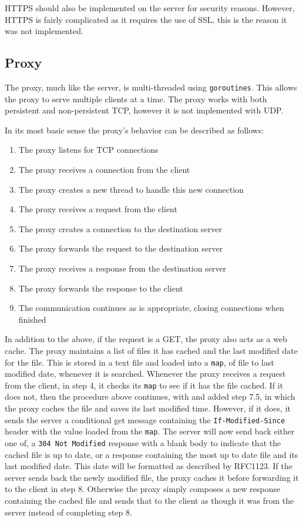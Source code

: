 \documentclass[10pt,twocolumn]{witseiepaper}
\begin{document}
	HTTPS should also be implemented on the server for security reasons. However, HTTPS is fairly complicated as it requires the use of SSL, this is the reason it was not implemented. 

	\subsection{Proxy}

	The proxy, much like the server, is multi-threaded using \texttt{goroutines}. This allows the proxy to serve multiple clients at a time. The proxy works with both persistent and non-persistent TCP, however it is not implemented with UDP. 

	In its most basic sense the proxy's behavior can be described as follows:

	\begin{enumerate}
		\item The proxy listens for TCP connections
		\item The proxy receives a connection from the client
		\item The proxy creates a new thread to handle this new connection
		\item The proxy receives a request from the client
		\item The proxy creates a connection to the destination server
		\item The proxy forwards the request to the destination server
		\item The proxy receives a response from the destination server
		\item The proxy forwards the response to the client
		\item The communication continues as is appropriate, closing connections when finished 
	\end{enumerate}

	In addition to the above, if the request is a GET, the proxy also acts as a web cache. The proxy maintains a list of files it has cached and the last modified date for the file. This is stored in a text file and loaded into a \texttt{map}, of file to last modified date, whenever it is searched. Whenever the proxy receives a request from the client, in step 4, it checks its \texttt{map} to see if it has the file cached. If it does not, then the procedure above continues, with and added step 7.5, in which the proxy caches the file and saves its last modified time. However, if it does, it sends the server a conditional get message containing the \texttt{If-Modified-Since} header with the value loaded from the \texttt{map}. The server will now send back either one of, a \texttt{304 Not Modified} response with a blank body to indicate that the cached file is up to date, or a response containing the most up to date file and its last modified date. This date will be formatted as described by RFC1123. If the server sends back the newly modified file, the proxy caches it before forwarding it to the client in step 8. Otherwise the proxy simply composes a new response containing the cached file and sends that to the client as though it was from the server instead of completing step 8.
\end{document}
